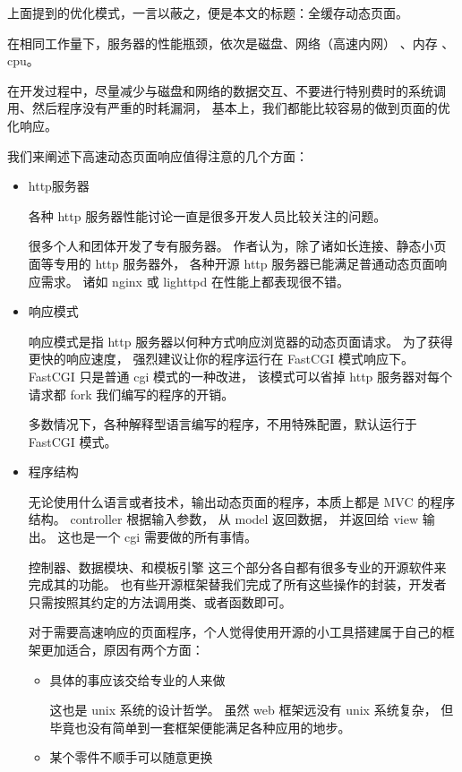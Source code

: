 \documentclass{article}
\begin{document}
  上面提到的优化模式，一言以蔽之，便是本文的标题：全缓存动态页面。

  在相同工作量下，服务器的性能瓶颈，依次是磁盘、网络（高速内网） 、内存 、cpu。

  在开发过程中，尽量减少与磁盘和网络的数据交互、不要进行特别费时的系统调用、然后程序没有严重的时耗漏洞，
  基本上，我们都能比较容易的做到页面的优化响应。

  我们来阐述下高速动态页面响应值得注意的几个方面：

  \begin{itemize}
  \item http服务器
    
    各种 http 服务器性能讨论一直是很多开发人员比较关注的问题。

    很多个人和团体开发了专有服务器。 作者认为，除了诸如长连接、静态小页面等专用的 http 服务器外，
    各种开源 http 服务器已能满足普通动态页面响应需求。 诸如 nginx 或 lighttpd 在性能上都表现很不错。
    
  \item 响应模式

    响应模式是指 http 服务器以何种方式响应浏览器的动态页面请求。 为了获得更快的响应速度，
    强烈建议让你的程序运行在 FastCGI 模式响应下。 FastCGI 只是普通 cgi 模式的一种改进，
    该模式可以省掉 http 服务器对每个请求都 fork 我们编写的程序的开销。

    多数情况下，各种解释型语言编写的程序，不用特殊配置，默认运行于 FastCGI 模式。
    
  \item 程序结构

    无论使用什么语言或者技术，输出动态页面的程序，本质上都是 MVC 的程序结构。 controller 根据输入参数，
    从 model 返回数据， 并返回给 view 输出。  这也是一个 cgi 需要做的所有事情。

    控制器、数据模块、和模板引擎 这三个部分各自都有很多专业的开源软件来完成其的功能。 
    也有些开源框架替我们完成了所有这些操作的封装，开发者只需按照其约定的方法调用类、或者函数即可。

    对于需要高速响应的页面程序，个人觉得使用开源的小工具搭建属于自己的框架更加适合，原因有两个方面：
    
    \begin{itemize}
    \item 具体的事应该交给专业的人来做

      这也是 unix 系统的设计哲学。 虽然 web 框架远没有 unix 系统复杂，
      但毕竟也没有简单到一套框架便能满足各种应用的地步。

    \item 某个零件不顺手可以随意更换


\end{itemize}
\end{itemize}
\end{document}
